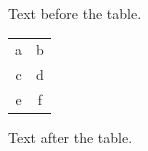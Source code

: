 \documentclass[12pt]{article}
\begin{document}
Text before the table.

\begin{tabular}{cc}\hhline{==}a&b\\\hhline{--}c&d\\\hhline{~~}e&f\\\end{tabular}

Text after the table.
\end{document}
